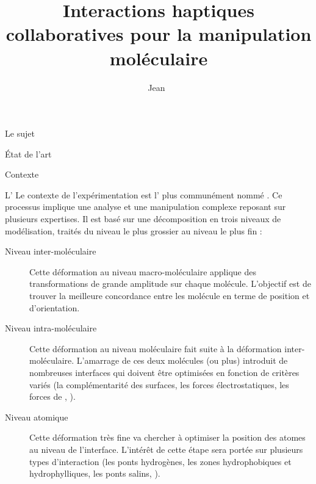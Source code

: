 \documentclass[myfrancais]{mythesis}
\title{Interactions haptiques collaboratives pour la manipulation moléculaire}
\author{Jean~\myname{Simard}}
\date{\mydate[datestyle=long]{01/12/2011}}
\begin{document}
	\frontmatter
	\maketitle
	\mytoc
	\mylof
	\mylot
	\mylotodo
	\mainmatter
	\begin{mychapter}{Le sujet}
		\begin{mysection}{État de l'art}
		\end{mysection}
		\begin{mysection}{Contexte}
			\begin{mysubsection}{L'}
				Le contexte de l'expérimentation est l' plus communément nommé .
				Ce processus implique une analyse et une manipulation complexe reposant sur plusieurs expertises.
				Il est basé sur une décomposition en trois niveaux de modélisation, traités du niveau le plus grossier au niveau le plus fin :
				\begin{description}
					\item[Niveau inter-moléculaire] Cette déformation au niveau macro-moléculaire applique des transformations de grande amplitude sur chaque molécule.
						L'objectif est de trouver la meilleure concordance entre les molécule en terme de position et d'orientation.
					\item[Niveau intra-moléculaire] Cette déformation au niveau moléculaire fait suite à la déformation inter-moléculaire.
						L'amarrage de ces deux molécules (ou plus) introduit de nombreuses interfaces qui doivent être optimisées en fonction de critères variés (la complémentarité des surfaces, les forces électrostatiques, les forces de  , \myetc).
					\item[Niveau atomique] Cette déformation très fine va chercher à optimiser la position des atomes au niveau de l'interface.
						L'intérêt de cette étape sera portée sur plusieurs types d'interaction (les ponts hydrogènes, les zones hydrophobiques et hydrophylliques, les ponts salins, \myetc).
				\end{description}


\end{mysubsection}
\end{mysection}
\end{mychapter}
\end{document}

